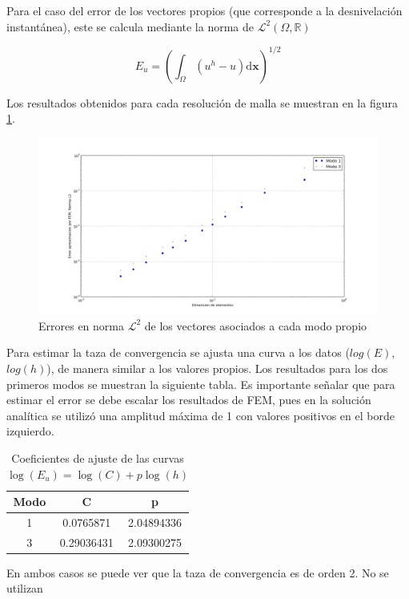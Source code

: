 Para el caso del error de los vectores propios (que corresponde a la desnivelaci\'on instant\'anea), este se calcula mediante la norma de $\mathcal{L}^2(\Omega,\mathbb{R})$

$$E_u = \left(\int_{\Omega} (u^h - u) \mathrm{d}\boldsymbol{x} \right)^{1/2}$$

Los resultados obtenidos para cada resoluci\'on de malla se muestran en la figura \ref{fig:vectores_propios}.

\begin{figure}
  \centering
  \includegraphics[width=17cm]{figuras/vectores_propiosFEM.png}
  \caption{Errores en norma $\mathcal{L}^2$ de los vectores asociados a cada modo propio}
  \label{fig:vectores_propios}
\end{figure}

Para estimar la taza de convergencia se ajusta una curva a los datos ($log(E)$, $log(h)$), de manera similar a los valores propios. Los resultados para los dos primeros modos se muestran la siguiente tabla. Es importante señalar que para estimar el error se debe escalar los resultados de FEM, pues en la soluci\'on anal\'itica se utiliz\'o una amplitud m\'axima de 1 con valores positivos en el borde izquierdo.

\begin{table}[h]
  \centering
  \begin{tabular}{|c|c|c|}
  \hline 
  Modo & C & p \\ 
  \hline 
  1 & 0.0765871 & 2.04894336 \\  
  \hline 
  3 & 0.29036431 & 2.09300275 \\  
  \hline 
  \end{tabular} 
  \caption{Coeficientes de ajuste de las curvas $\log(E_u)=\log(C)+p\log(h)$}
\end{table}

En ambos casos se puede ver que la taza de convergencia es de orden 2.
No se utilizan



